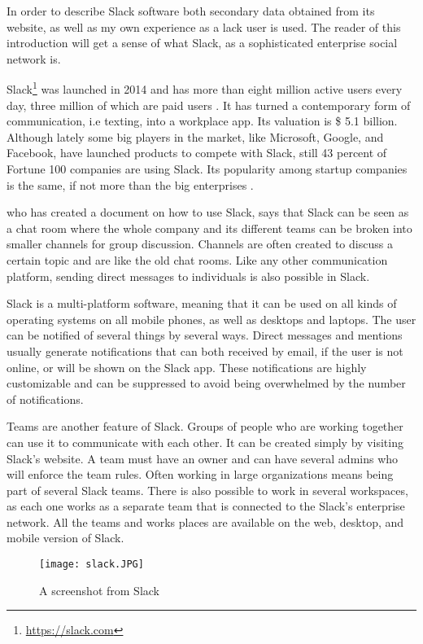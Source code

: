 In order to describe Slack software both secondary data obtained from its website, as well as my own experience as a lack user is used. The reader of this introduction will get a sense of what Slack, as a sophisticated enterprise social network is.

Slack\footnote{\url{https://slack.com}} was launched in 2014 and has more than eight million active users every day, three million of which are paid users \citep{Lynley2018}. It has turned a contemporary form of communication, i.e texting, into a workplace app. Its valuation is \$ 5.1 billion. Although lately some big players in the market, like Microsoft, Google, and Facebook, have launched products to compete with Slack, still 43 percent of Fortune 100 companies are using Slack. Its popularity among startup companies is the same, if not more than the big enterprises \citep{Rodriguez2018}.

\citet{Williams2015a} who has created a document on how to use Slack, says that Slack can be seen as a chat room where the whole company and its different teams can be broken into smaller channels for group discussion. Channels are often created to discuss a certain topic and are like the old chat rooms. Like any other communication platform, sending direct messages to individuals is also possible in Slack.

Slack is a multi-platform software, meaning that it can be used on all kinds of operating systems on all mobile phones, as well as desktops and laptops. The user can be notified of several things by several ways. Direct messages and mentions usually generate notifications that can both received by email, if the user is not online, or will be shown on the Slack app. These notifications are highly customizable and can be suppressed to avoid being overwhelmed by the number of notifications. 

Teams are another feature of Slack. Groups of people who are working together can use it to communicate with each other. It can be created simply by visiting Slack's website. A team must have an owner and can have several admins who will enforce the team rules. Often working in large organizations means being part of several Slack teams. There is also possible to work in several workspaces, as each one works as a separate team that is connected to the Slack's enterprise network.  All the teams and works places are available on the web, desktop, and mobile version of Slack.

\begin{figure}[hbt!]
\centering
\texttt{[image: slack.JPG]}
\caption{A screenshot from Slack}\label{fig:slack}
\end{figure}


